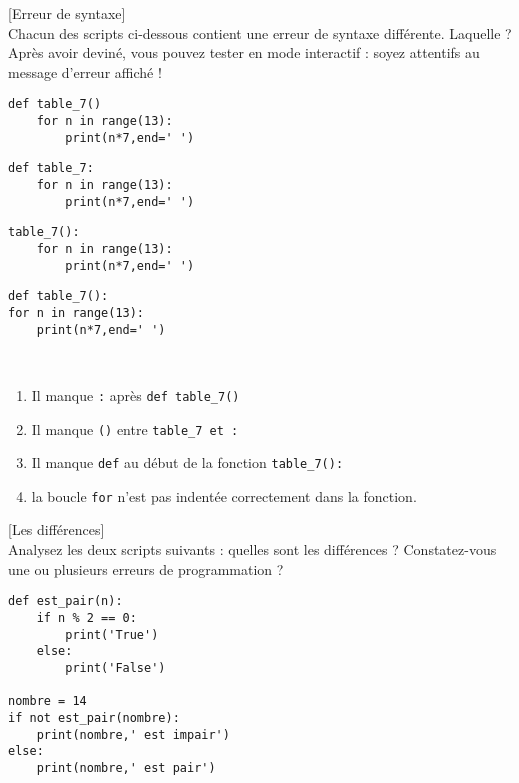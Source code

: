 \documentclass[a4paper,12pt]{article}
\begin{document}
\finexo
\exo{}[Erreur de syntaxe]  ~\\ 
Chacun des scripts ci-dessous contient une erreur de syntaxe différente. Laquelle ? Après avoir deviné, vous pouvez tester en mode interactif : soyez attentifs au message d’erreur affiché !
\begin{lstlisting}
def table_7()
    for n in range(13):
        print(n*7,end=' ')
\end{lstlisting} 
\begin{lstlisting}           
def table_7:
    for n in range(13):
        print(n*7,end=' ')        
\end{lstlisting} 
\begin{lstlisting}   
table_7():
    for n in range(13):
        print(n*7,end=' ')
\end{lstlisting} 
\begin{lstlisting}       
def table_7():
for n in range(13):
    print(n*7,end=' ')
\end{lstlisting}
\begin{correction}
	~\\ \vspace{-5pt}
	\begin{enumerate}
        \item Il manque \lstinline{:} après \lstinline{def table_7()}
        \item Il manque \lstinline{()} entre \lstinline{table_7 et :}
        \item Il manque \lstinline{def} au début de la fonction \lstinline{table_7():}
        \item la boucle \lstinline{for} n'est pas indentée correctement dans la fonction.
    \end{enumerate}
\end{correction}
\finexo
\newpage
\exo{}[Les différences]  ~\\ 
Analysez les deux scripts suivants : quelles sont les différences ? Constatez-vous une ou plusieurs erreurs de programmation ?
\begin{lstlisting}
def est_pair(n):
    if n % 2 == 0:
        print('True')
    else:
        print('False')

nombre = 14
if not est_pair(nombre):
    print(nombre,' est impair')
else:
    print(nombre,' est pair')
\end{lstlisting} 
\end{document}
